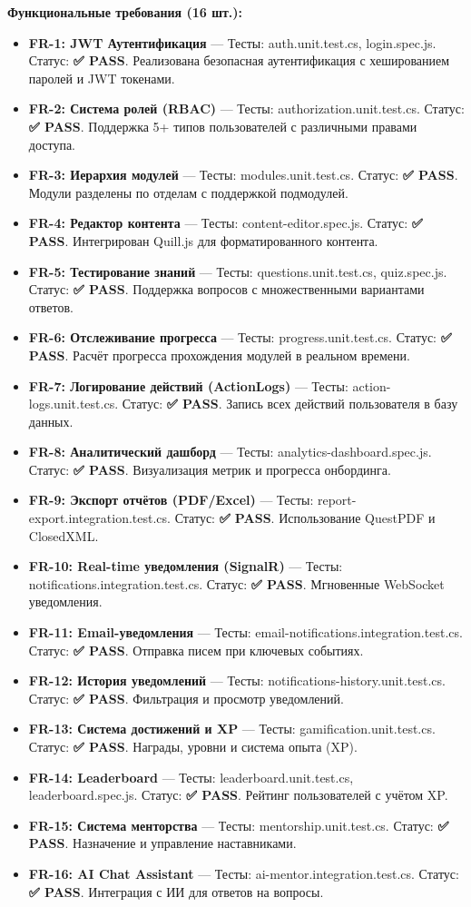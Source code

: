 \textbf{Функциональные требования (16 шт.):}
\begin{itemize}
	\item \textbf{FR-1: JWT Аутентификация} --- Тесты: auth.unit.test.cs, login.spec.js. Статус: \textbf{✅ PASS}. Реализована безопасная аутентификация с хешированием паролей и JWT токенами.
	\item \textbf{FR-2: Система ролей (RBAC)} --- Тесты: authorization.unit.test.cs. Статус: \textbf{✅ PASS}. Поддержка 5+ типов пользователей с различными правами доступа.
	\item \textbf{FR-3: Иерархия модулей} --- Тесты: modules.unit.test.cs. Статус: \textbf{✅ PASS}. Модули разделены по отделам с поддержкой подмодулей.
	\item \textbf{FR-4: Редактор контента} --- Тесты: content-editor.spec.js. Статус: \textbf{✅ PASS}. Интегрирован Quill.js для форматированного контента.
	\item \textbf{FR-5: Тестирование знаний} --- Тесты: questions.unit.test.cs, quiz.spec.js. Статус: \textbf{✅ PASS}. Поддержка вопросов с множественными вариантами ответов.
	\item \textbf{FR-6: Отслеживание прогресса} --- Тесты: progress.unit.test.cs. Статус: \textbf{✅ PASS}. Расчёт прогресса прохождения модулей в реальном времени.
	\item \textbf{FR-7: Логирование действий (ActionLogs)} --- Тесты: action-logs.unit.test.cs. Статус: \textbf{✅ PASS}. Запись всех действий пользователя в базу данных.
	\item \textbf{FR-8: Аналитический дашборд} --- Тесты: analytics-dashboard.spec.js. Статус: \textbf{✅ PASS}. Визуализация метрик и прогресса онбординга.
	\item \textbf{FR-9: Экспорт отчётов (PDF/Excel)} --- Тесты: report-export.integration.test.cs. Статус: \textbf{✅ PASS}. Использование QuestPDF и ClosedXML.
	\item \textbf{FR-10: Real-time уведомления (SignalR)} --- Тесты: notifications.integration.test.cs. Статус: \textbf{✅ PASS}. Мгновенные WebSocket уведомления.
	\item \textbf{FR-11: Email-уведомления} --- Тесты: email-notifications.integration.test.cs. Статус: \textbf{✅ PASS}. Отправка писем при ключевых событиях.
	\item \textbf{FR-12: История уведомлений} --- Тесты: notifications-history.unit.test.cs. Статус: \textbf{✅ PASS}. Фильтрация и просмотр уведомлений.
	\item \textbf{FR-13: Система достижений и XP} --- Тесты: gamification.unit.test.cs. Статус: \textbf{✅ PASS}. Награды, уровни и система опыта (XP).
	\item \textbf{FR-14: Leaderboard} --- Тесты: leaderboard.unit.test.cs, leaderboard.spec.js. Статус: \textbf{✅ PASS}. Рейтинг пользователей с учётом XP.
	\item \textbf{FR-15: Система менторства} --- Тесты: mentorship.unit.test.cs. Статус: \textbf{✅ PASS}. Назначение и управление наставниками.
	\item \textbf{FR-16: AI Chat Assistant} --- Тесты: ai-mentor.integration.test.cs. Статус: \textbf{✅ PASS}. Интеграция с ИИ для ответов на вопросы.
\end{itemize}

